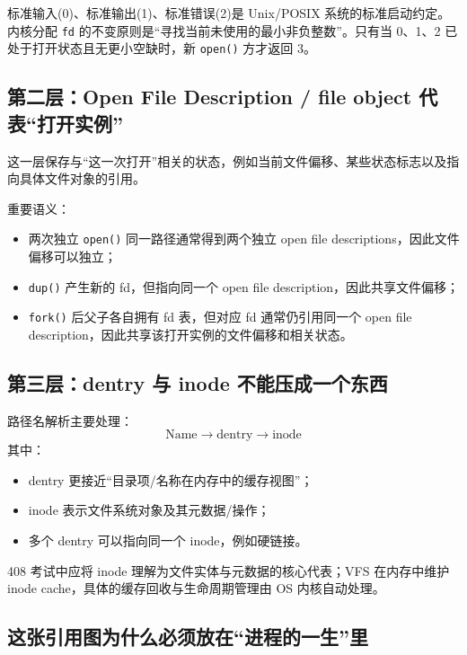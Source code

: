 \documentclass[11pt,a4paper]{ctexart}
\newcommand{\code}[1]{\texttt{#1}}
\begin{document}
\begin{warn}[文件描述符分配规则与 0/1/2 约定]
标准输入(0)、标准输出(1)、标准错误(2)是 Unix/POSIX 系统的标准启动约定。内核分配 \code{fd} 的不变原则是“寻找当前未使用的最小非负整数”。只有当 0、1、2 已处于打开状态且无更小空缺时，新 \code{open()} 方才返回 3。
\end{warn}

\subsection{第二层：Open File Description / file object 代表“打开实例”}

这一层保存与“这一次打开”相关的状态，例如当前文件偏移、某些状态标志以及指向具体文件对象的引用。

重要语义：
\begin{itemize}
\item 两次独立 \code{open()} 同一路径通常得到两个独立 open file descriptions，因此文件偏移可以独立；
\item \code{dup()} 产生新的 fd，但指向同一个 open file description，因此共享文件偏移；
\item \code{fork()} 后父子各自拥有 fd 表，但对应 fd 通常仍引用同一个 open file description，因此共享该打开实例的文件偏移和相关状态。
\end{itemize}

\subsection{第三层：dentry 与 inode 不能压成一个东西}

路径名解析主要处理：
\[
\boxed{\text{Name}\rightarrow\text{dentry}\rightarrow\text{inode}}
\]
其中：
\begin{itemize}
\item dentry 更接近“目录项/名称在内存中的缓存视图”；
\item inode 表示文件系统对象及其元数据/操作；
\item 多个 dentry 可以指向同一个 inode，例如硬链接。
\end{itemize}

\begin{warn}
408 考试中应将 inode 理解为文件实体与元数据的核心代表；VFS 在内存中维护 inode cache，具体的缓存回收与生命周期管理由 OS 内核自动处理。
\end{warn}

\subsection{这张引用图为什么必须放在“进程的一生”里}
\end{document}
